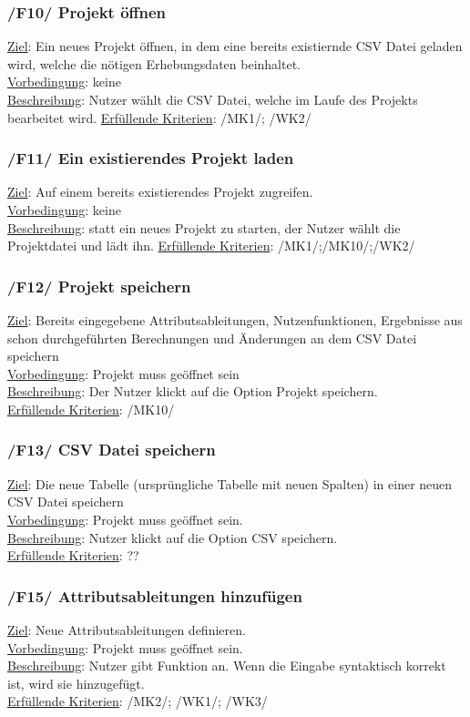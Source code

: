 \documentclass{article}
\begin{document}
\subsubsection*{/F10/ Projekt öffnen}
\underline {Ziel}:  Ein neues Projekt öffnen, in dem eine bereits existiernde CSV Datei geladen wird, welche die nötigen Erhebungsdaten beinhaltet. \\
\underline{Vorbedingung}: keine\\
\underline{Beschreibung}: Nutzer wählt die CSV Datei, welche im Laufe des Projekts bearbeitet wird.
\underline{Erfüllende Kriterien}: /MK1/; /WK2/
\subsubsection*{/F11/ Ein existierendes Projekt laden}
\underline{Ziel}: Auf einem bereits existierendes Projekt zugreifen. \\
\underline{Vorbedingung}: keine \\
\underline{Beschreibung}: statt ein neues Projekt zu starten, der Nutzer wählt die Projektdatei und lädt ihn.
\underline{Erfüllende Kriterien}: /MK1/;/MK10/;/WK2/
\subsubsection*{/F12/ Projekt speichern}
\underline{Ziel}: Bereits eingegebene Attributsableitungen, Nutzenfunktionen, Ergebnisse aus schon durchgeführten Berechnungen und Änderungen an dem CSV Datei speichern\\
\underline{Vorbedingung}: Projekt muss geöffnet sein \\
\underline{Beschreibung}: Der Nutzer klickt auf die Option Projekt speichern. \\
\underline{Erfüllende Kriterien}: /MK10/
\newpage
\subsubsection*{/F13/ CSV Datei speichern}
\underline{Ziel}: Die neue Tabelle (ursprüngliche Tabelle mit neuen Spalten) in einer neuen CSV Datei speichern\\
\underline{Vorbedingung}: Projekt muss geöffnet sein. \\
\underline{Beschreibung}: Nutzer klickt auf die Option CSV speichern.\\
\underline{Erfüllende Kriterien}: ??
\subsubsection*{/F15/ Attributsableitungen hinzufügen}
\underline{Ziel}: Neue Attributsableitungen definieren. \\
\underline{Vorbedingung}: Projekt muss geöffnet sein. \\
\underline{Beschreibung}: Nutzer gibt Funktion an. Wenn die Eingabe syntaktisch korrekt ist, wird sie hinzugefügt.\\
\underline{Erfüllende Kriterien}: /MK2/; /WK1/; /WK3/
\end{document}
